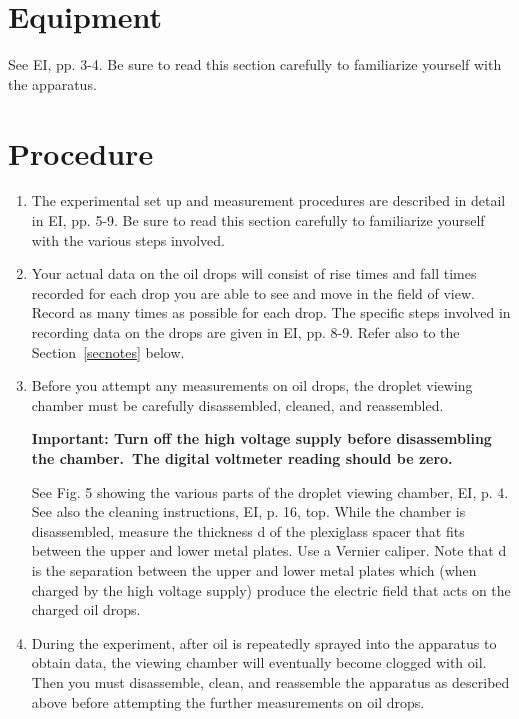 \section{Equipment}
See EI, pp. 3-4.  Be sure to read this section carefully to
familiarize yourself with the apparatus.


\section{Procedure}

\begin{enumerate}
\item The experimental set up and measurement procedures are described
in detail in EI, pp. 5-9. Be sure to read this section carefully to
familiarize yourself with the various steps involved.


\item Your actual data on the oil drops will consist of rise times and
fall times recorded for each drop you are able to see and move in the
field of view.  Record as many times as possible for each drop. The
specific steps involved in recording data on the drops are given in EI,
pp. 8-9.  Refer also to the Section~\ref{secnotes} below.

\item Before you attempt any measurements on oil drops, the droplet
viewing chamber must be carefully disassembled, cleaned, and
reassembled.

{\bfseries Important: Turn off the high voltage supply before disassembling the
chamber.\ The digital voltmeter reading should be zero.}

See Fig. 5 showing the various parts of the droplet viewing chamber,
EI, p. 4.  See also the cleaning instructions, EI, p. 16, top. While
the chamber is disassembled, measure the thickness d of the plexiglass
spacer that fits between the upper and lower metal plates. Use a
Vernier caliper.  Note that d is the separation between the upper and
lower metal plates which (when charged by the high voltage supply)
produce the electric field that acts on the charged oil drops.


\item During the experiment, after oil is repeatedly sprayed into the
apparatus to obtain data, the viewing chamber will eventually become
clogged with oil. Then you must disassemble, clean, and reassemble the
apparatus as described above before attempting the further measurements
on oil drops.
\end{enumerate}

